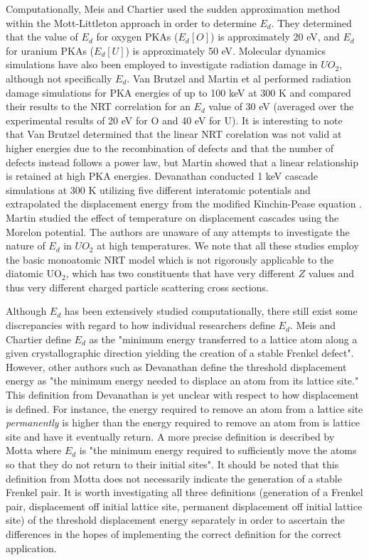 \documentclass[8pt]{article}   	%
\begin{document}
Computationally, Meis and Chartier \cite{meis2005} used the sudden approximation method within the Mott-Littleton approach \cite{Litt} in order to determine $E_d$. They determined that the value of $E_d$ for oxygen PKAs ($E_d [O]$) is approximately 20 eV, and $E_d$ for uranium PKAs ($E_d [U]$) is approximately 50 eV. Molecular dynamics simulations have also been employed to investigate radiation damage in $UO_2$, although not specifically $E_d$. Van Brutzel \cite{vanbrutzel2003,vanbrutzel2006} and Martin et al \cite{martin2011} performed radiation damage simulations for PKA energies of up to 100 keV at 300 K and compared their results to the NRT correlation for an $E_d$ value of 30 eV (averaged over the experimental results of 20 eV for O and 40 eV for U). It is interesting to note that Van Brutzel determined that the linear NRT corelation was not valid at higher energies due to the recombination of defects and that the number of defects instead follows a power law, but Martin showed that a linear relationship is retained at high PKA energies. Devanathan \cite{devanathan2009} conducted 1 keV cascade simulations at 300 K utilizing five different interatomic potentials and extrapolated the displacement energy from the modified Kinchin-Pease equation \cite{kinchinpease}. Martin \cite{martin2015, martin2014} studied the effect of temperature on displacement cascades using the Morelon \cite{morelon2003} potential. The authors are unaware of any attempts to investigate the nature of $E_d$ in $UO_2$ at high temperatures. We note that all these studies employ the basic monoatomic NRT model which is not rigorously applicable to the diatomic UO$_2$,  which has two constituents that have very different $Z$ values and thus very different charged particle scattering cross sections.

Although $E_d$ has been extensively studied computationally, there still exist some discrepancies with regard to how individual researchers define $E_d$. Meis and Chartier \cite{meis2005} define $E_d$ as the "minimum energy transferred to a lattice atom along a given crystallographic direction yielding the creation of a stable Frenkel defect". However, other authors such as Devanathan \cite{devanathan1998} define the threshold displacement energy as "the minimum energy needed to displace an atom from its lattice site." This definition from Devanathan is yet unclear with respect to how displacement is defined. For instance, the energy required to remove an atom from a lattice site \textit{permanently} is higher than the energy required to remove an atom from is lattice site and have it eventually return. A more precise definition is described by Motta \cite{Motta}  where $E_d$ is "the minimum energy required to sufficiently move the atoms so that they do not return to their initial sites". It should be noted that this definition from Motta does not necessarily indicate the generation of a stable Frenkel pair. It is worth investigating all three definitions (generation of a Frenkel pair, displacement off initial lattice site, permanent displacement off initial lattice site) of the threshold displacement energy separately in order to ascertain the differences in the hopes of implementing the correct definition for the correct application.
\end{document}
